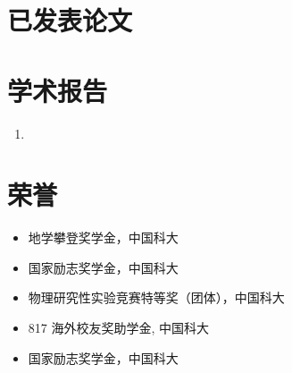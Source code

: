 \documentclass{mycv_cn}
\begin{document}
\section{已发表论文}
\section{学术报告}

\begin{enumerate}
  \item
\end{enumerate}

\section{荣誉}

\begin{itemize}
  \item 地学攀登奖学金，中国科大 
  \item 国家励志奖学金，中国科大 
  \item 物理研究性实验竞赛特等奖（团体），中国科大 
  \item 817 海外校友奖助学金, 中国科大 
  \item 国家励志奖学金，中国科大 
\end{itemize}
\end{document}
